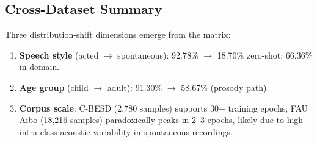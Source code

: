 \subsection{Cross-Dataset Summary}

Three distribution-shift dimensions emerge from the matrix:
\begin{enumerate}
\item \textbf{Speech style} (acted $\rightarrow$ spontaneous): 92.78\% $\rightarrow$ 18.70\% zero-shot; 66.36\% in-domain.
\item \textbf{Age group} (child $\rightarrow$ adult): 91.30\% $\rightarrow$ 58.67\% (prosody path).
\item \textbf{Corpus scale}: C-BESD (2,780 samples) supports 30+ training epochs; FAU Aibo (18,216 samples) paradoxically peaks in 2--3 epochs, likely due to high intra-class acoustic variability in spontaneous recordings.
\end{enumerate}
